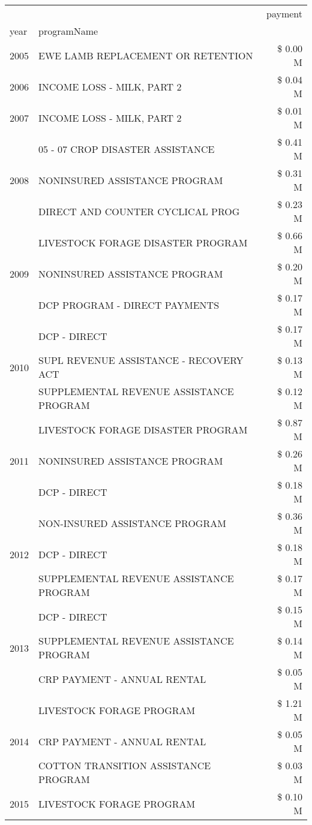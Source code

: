 \begin{tabular}{llr}
\toprule
 &  & payment \\
year & programName &  \\
\midrule
2005 & EWE LAMB REPLACEMENT OR RETENTION & \$ 0.00 M \\
\cline{1-3}
2006 & INCOME LOSS - MILK, PART 2 & \$ 0.04 M \\
\cline{1-3}
2007 & INCOME LOSS - MILK, PART 2 & \$ 0.01 M \\
\cline{1-3}
\multirow[t]{3}{*}{2008} & 05 - 07 CROP DISASTER ASSISTANCE & \$ 0.41 M \\
 & NONINSURED ASSISTANCE PROGRAM & \$ 0.31 M \\
 & DIRECT AND COUNTER CYCLICAL PROG & \$ 0.23 M \\
\cline{1-3}
\multirow[t]{3}{*}{2009} & LIVESTOCK FORAGE DISASTER  PROGRAM & \$ 0.66 M \\
 & NONINSURED ASSISTANCE PROGRAM & \$ 0.20 M \\
 & DCP PROGRAM - DIRECT PAYMENTS & \$ 0.17 M \\
\cline{1-3}
\multirow[t]{3}{*}{2010} & DCP - DIRECT & \$ 0.17 M \\
 & SUPL REVENUE ASSISTANCE - RECOVERY ACT & \$ 0.13 M \\
 & SUPPLEMENTAL REVENUE ASSISTANCE PROGRAM & \$ 0.12 M \\
\cline{1-3}
\multirow[t]{3}{*}{2011} & LIVESTOCK FORAGE DISASTER PROGRAM & \$ 0.87 M \\
 & NONINSURED ASSISTANCE PROGRAM & \$ 0.26 M \\
 & DCP - DIRECT & \$ 0.18 M \\
\cline{1-3}
\multirow[t]{3}{*}{2012} & NON-INSURED ASSISTANCE PROGRAM & \$ 0.36 M \\
 & DCP - DIRECT & \$ 0.18 M \\
 & SUPPLEMENTAL REVENUE ASSISTANCE PROGRAM & \$ 0.17 M \\
\cline{1-3}
\multirow[t]{3}{*}{2013} & DCP - DIRECT & \$ 0.15 M \\
 & SUPPLEMENTAL REVENUE ASSISTANCE PROGRAM & \$ 0.14 M \\
 & CRP PAYMENT - ANNUAL RENTAL & \$ 0.05 M \\
\cline{1-3}
\multirow[t]{3}{*}{2014} & LIVESTOCK FORAGE PROGRAM & \$ 1.21 M \\
 & CRP PAYMENT - ANNUAL RENTAL & \$ 0.05 M \\
 & COTTON TRANSITION ASSISTANCE PROGRAM & \$ 0.03 M \\
\cline{1-3}
\multirow[t]{3}{*}{2015} & LIVESTOCK FORAGE PROGRAM & \$ 0.10 M \\

\end{tabular}
